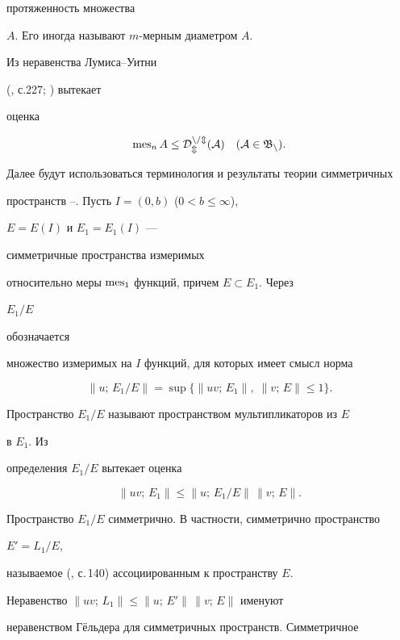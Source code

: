 протяженность множества 


$A$. Его иногда называют $m$-мерным диаметром $A$. 


Из неравенства Лумиса--Уитни 


(\cite{Had}, с.227; \cite{Gal}) вытекает 


оценка 


\begin{equation} 




\mes_n A \le \cal D_m^{n/m}(A) \quad (A\in\frak B_n). 


\end{equation} 


 


Далее будут использоваться терминология и результаты теории симметричных 


пространств \cite{Kre}--\cite{Se}. Пусть $I=(0,b)$ ($0<b\le\infty$), 


$E=E(I)$ и $E_1=E_1(I)$ --- 


симметричные пространства измеримых 


относительно меры $\operatorname{mes}_1$ функций, причем $E\subset E_1$. Через 


$E_1/E$ 


обозначается 


\cite{Za} множество измеримых на $I$ функций, для которых имеет смысл норма 


$$ 


\|u;\,E_1/E\|=\sup\{\|uv;\,E_1\|,\;\|v;\,E\|\le 1\}. 


$$ 


Пространство $E_1/E$ называют пространством мультипликаторов из $E$ 


в $E_1$. Из 


определения $E_1/E$ вытекает оценка 


$$ 


\|uv;\,E_1\| \le \|u;\,E_1/E\|\,\|v;\,E\|. 


$$ 


Пространство $E_1/E$ симметрично. В частности, симметрично пространство 


$E'=L_1/E$, 


называемое (\cite{Kre}, с.\,140) ассоциированным к пространству $E$. 


Неравенство $\|uv;\,L_1\|\le\|u;\,E'\|\,\|v;\,E\|$ именуют 


неравенством Г\"ельдера для симметричных пространств. Симметричное 


